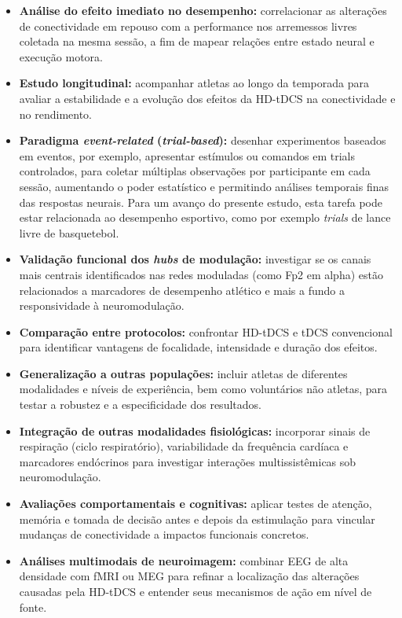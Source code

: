 \begin{itemize}
  \item \textbf{Análise do efeito imediato no desempenho:} correlacionar as alterações de conectividade em repouso com a performance nos arremessos livres coletada na mesma sessão, a fim de mapear relações entre estado neural e execução motora.
  \item \textbf{Estudo longitudinal:} acompanhar atletas ao longo da temporada para avaliar a estabilidade e a evolução dos efeitos da HD-tDCS na conectividade e no rendimento.
  \item \textbf{Paradigma \textit{event-related} (\textit{trial-based}):} desenhar experimentos baseados em eventos, por exemplo, apresentar estímulos ou comandos em trials controlados, para coletar múltiplas observações por participante em cada sessão, aumentando o poder estatístico e permitindo análises temporais finas das respostas neurais. Para um avanço do presente estudo, esta tarefa pode estar relacionada ao desempenho esportivo, como por exemplo \textit{trials} de lance livre de basquetebol.
  \item \textbf{Validação funcional dos \textit{hubs} de modulação:} investigar se os canais mais centrais identificados nas redes moduladas (como Fp2 em alpha) estão relacionados a marcadores de desempenho atlético e mais a fundo a responsividade à neuromodulação.
  \item \textbf{Comparação entre protocolos:} confrontar HD-tDCS e tDCS convencional para identificar vantagens de focalidade, intensidade e duração dos efeitos.
  \item \textbf{Generalização a outras populações:} incluir atletas de diferentes modalidades e níveis de experiência, bem como voluntários não atletas, para testar a robustez e a especificidade dos resultados.
  \item \textbf{Integração de outras modalidades fisiológicas:} incorporar sinais de respiração (ciclo respiratório), variabilidade da frequência cardíaca e marcadores endócrinos para investigar interações multissistêmicas sob neuromodulação.
  \item \textbf{Avaliações comportamentais e cognitivas:} aplicar testes de atenção, memória e tomada de decisão antes e depois da estimulação para vincular mudanças de conectividade a impactos funcionais concretos.
  \item \textbf{Análises multimodais de neuroimagem:} combinar EEG de alta densidade com fMRI ou MEG para refinar a localização das alterações causadas pela HD-tDCS e entender seus mecanismos de ação em nível de fonte.
\end{itemize}